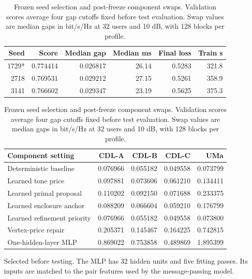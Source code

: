 \begin{table}[htbp]\centering\small
\caption{Frozen seed selection and post-freeze component swaps. Validation scores average four gap cutoffs fixed before test evaluation. Swap values are median gaps in bit/s/Hz at 32 users and 10 dB, with 128 blocks per profile.}\label{supp:table4}
\begin{tabular}{rrrrrr}\toprule Seed & Score & Median gap & Median ms & Final loss & Train s\\\midrule
1729* & 0.774414 & 0.026817 & 26.14 & 0.5283 & 321.8\\
2718 & 0.769531 & 0.029212 & 27.15 & 0.5261 & 358.9\\
3141 & 0.766602 & 0.029347 & 23.19 & 0.5625 & 375.3\\
\bottomrule\end{tabular}\par\smallskip
\begin{tabular}{lrrrr}\toprule Component setting & CDL-A & CDL-B & CDL-C & UMa\\\midrule
Deterministic baseline & 0.076966 & 0.055182 & 0.049558 & 0.073799\\
Learned tone price & 0.097881 & 0.073606 & 0.061210 & 0.134411\\
Learned primal proposal & 0.110202 & 0.092150 & 0.071688 & 0.233375\\
Learned enclosure anchor & 0.088209 & 0.066604 & 0.059210 & 0.176799\\
Learned refinement priority & 0.076966 & 0.055182 & 0.049558 & 0.073800\\
Vertex-price repair & 0.205371 & 0.145467 & 0.164225 & 0.742815\\
One-hidden-layer MLP & 0.869022 & 0.753858 & 0.489869 & 1.895399\\
\bottomrule\end{tabular}\par\smallskip\footnotesize *Selected before testing. The MLP has 32 hidden units and five fitting passes. Its inputs are matched to the pair features used by the message-passing model.\end{table}
